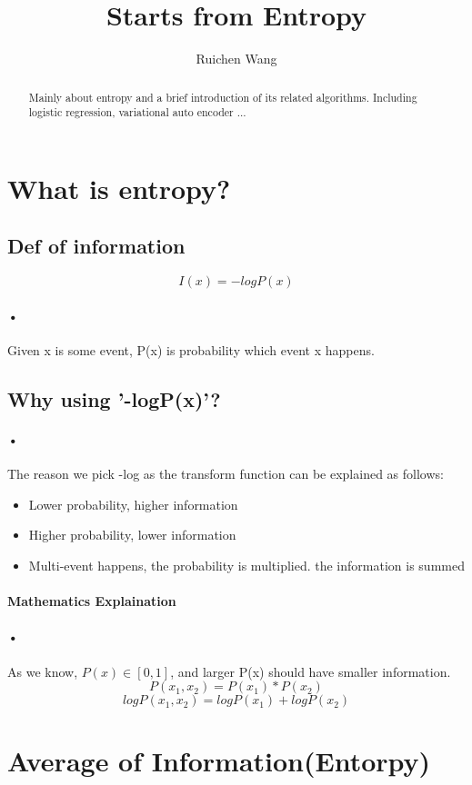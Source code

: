 \documentclass{article}
\author{Ruichen Wang}
\title{Starts from Entropy}
\begin{document}
\maketitle

\begin{abstract}
Mainly about entropy and a brief introduction of its related algorithms.
Including logistic regression, variational auto encoder ...
\end{abstract}

\tableofcontents
\section{What is entropy?} 
\subsection{Def of information}
$$I(x)=-logP(x)$$
\paragraph{•}
Given x is some event, P(x) is probability which event x happens.
\subsection{Why using '-logP(x)'?}
\paragraph{•}
The reason we pick -log as the transform function can be explained as follows:
\begin{itemize}
\item Lower probability, higher information
\item Higher probability, lower information
\item Multi-event happens, the probability is multiplied. the information is summed
\end{itemize}
\paragraph{Mathematics Explaination}
\paragraph{•}
As we know, $P(x) \in [0,1]$, and larger P(x) should have smaller information.
$$P(x_{1},x_{2})=P(x_{1})*P(x_{2})$$
$$logP(x_{1},x_{2})=logP(x_{1})+logP(x_{2})$$
\section{Average of Information(Entorpy)}
\end{document}
